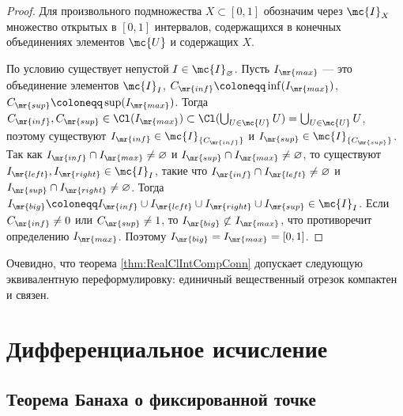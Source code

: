 \documentclass[
	extrafontsizes,
	11pt,
	hyphens,
]{memoir}
\begin{document}
\begin{proof}
Для произвольного подмножества \(X \subset [0,1]\) обозначим через \(\mc{I}_X\) множество открытых в \([0,1]\) интервалов, содержащихся в конечных объединениях элементов \(\mc{U}\) и содержащих \(X\).

По условию существует непустой \(I \in \mc{I}_\varnothing\).
Пусть \(I_\mr{max}\) --- это объединение элементов \(\mc{I}_I\), \(C_\mr{inf} \coloneqq \inf(I_\mr{max})\), \(C_\mr{sup} \coloneqq \sup(I_\mr{max})\).
Тогда \(C_\mr{inf}, C_\mr{sup} \in \Cl(I_\mr{max}) \subset \Cl(\bigcup_{U \in \mc{U}} U) = \bigcup_{U \in \mc{U}} U\),
поэтому существуют \(I_\mr{inf} \in \mc{I}_{\{C_\mr{inf}\}}\) и \(I_\mr{sup} \in \mc{I}_{\{C_\mr{sup}\}}\).
Так как
\(I_\mr{inf} \cap I_\mr{max} \neq \varnothing\) и
\(I_\mr{sup} \cap I_\mr{max} \neq \varnothing\),
то существуют \(I_\mr{left}, I_\mr{right} \in \mc{I}_I\), такие что
\(I_\mr{inf} \cap I_\mr{left} \neq \varnothing\) и
\(I_\mr{sup} \cap I_\mr{right} \neq \varnothing\).
Тогда
\(I_\mr{big} \coloneqq I_\mr{inf} \cup I_\mr{left} \cup I_\mr{right} \cup I_\mr{sup} \in \mc{I}_I\).
Если \(C_\mr{inf} \neq 0\) или \(C_\mr{sup} \neq 1\),
то \(I_\mr{big} \not\subset I_\mr{max}\), что противоречит определению \(I_\mr{max}\).
Поэтому \(I_\mr{big} = I_\mr{max} = [0,1]\).
\end{proof}

\begin{remark}
Очевидно, что теорема \ref{thm:RealClIntCompConn} допускает следующую эквивалентную переформулировку: единичный вещественный отрезок компактен и связен.
\end{remark}



\chapter{Дифференциальное исчисление}


\section{Теорема Банаха о фиксированной точке}

\end{document}
